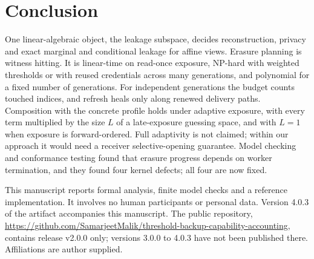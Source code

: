 \documentclass[pdflatex,sn-mathphys-num]{sn-jnl}
\theoremstyle{plain}
\theoremstyle{definition}
\begin{document}
\section{Conclusion}
One linear-algebraic object, the leakage subspace, decides reconstruction, privacy and exact marginal and conditional leakage for affine views. Erasure planning is witness hitting. It is linear-time on read-once exposure, NP-hard with weighted thresholds or with reused credentials across many generations, and polynomial for a fixed number of generations. For independent generations the budget counts touched indices, and refresh heals only along renewed delivery paths. Composition with the concrete profile holds under adaptive exposure, with every term multiplied by the size $L$ of a late-exposure guessing space, and with $L=1$ when exposure is forward-ordered. Full adaptivity is not claimed; within our approach it would need a receiver selective-opening guarantee. Model checking and conformance testing found that erasure progress depends on worker termination, and they found four kernel defects; all four are now fixed.


\backmatter
{}
This manuscript reports formal analysis, finite model checks and a reference implementation. It involves no human participants or personal data. Version 4.0.3 of the artifact accompanies this manuscript. The public repository, \url{https://github.com/SamarjeetMalik/threshold-backup-capability-accounting}, contains release v2.0.0 only; versions 3.0.0 to 4.0.3 have not been published there. Affiliations are author supplied.
\end{document}
